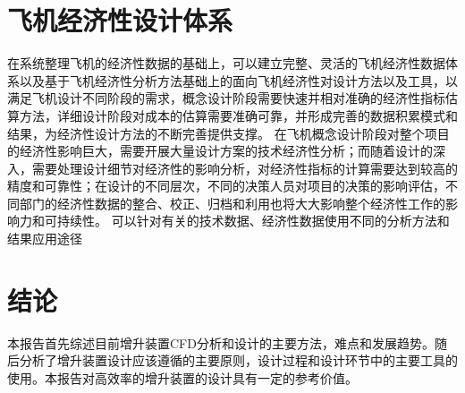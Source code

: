 \section{飞机经济性设计体系
}在系统整理飞机的经济性数据的基础上，可以建立完整、灵活的飞机经济性数据体系以及基于飞机经济性分析方法基础上的面向飞机经济性对设计方法以及工具，以满足飞机设计不同阶段的需求，概念设计阶段需要快速并相对准确的经济性指标估算方法，详细设计阶段对成本的估算需要准确可靠，并形成完善的数据积累模式和结果，为经济性设计方法的不断完善提供支撑。
在飞机概念设计阶段对整个项目的经济性影响巨大，需要开展大量设计方案的技术经济性分析；而随着设计的深入，需要处理设计细节对经济性的影响分析，对经济性指标的计算需要达到较高的精度和可靠性；在设计的不同层次，不同的决策人员对项目的决策的影响评估，不同部门的经济性数据的整合、校正、归档和利用也将大大影响整个经济性工作的影响力和可持续性。
可以针对有关的技术数据、经济性数据使用不同的分析方法和结果应用途径


\section{结论}
本报告首先综述目前增升装置CFD分析和设计的主要方法，难点和发展趋势。随后分析了增升装置设计应该遵循的主要原则，设计过程和设计环节中的主要工具的使用。本报告对高效率的增升装置的设计具有一定的参考价值。